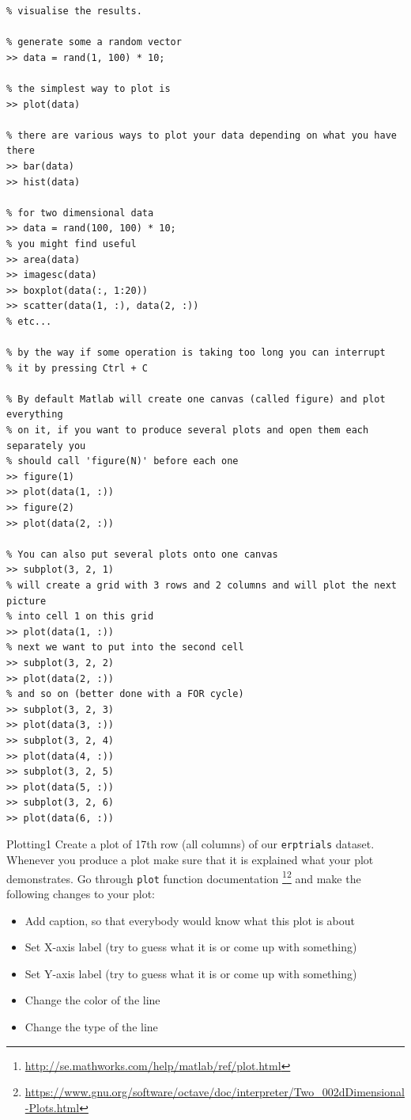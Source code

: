 \documentclass[a4paper,11pt]{article}
\begin{document}
%
%
\begin{lstlisting}[caption={Plotting}]
% One of the most important abilities in any data analysis task is the ability to
% visualise the results.

% generate some a random vector
>> data = rand(1, 100) * 10;

% the simplest way to plot is
>> plot(data)

% there are various ways to plot your data depending on what you have there
>> bar(data)
>> hist(data)

% for two dimensional data
>> data = rand(100, 100) * 10;
% you might find useful
>> area(data)
>> imagesc(data)
>> boxplot(data(:, 1:20))
>> scatter(data(1, :), data(2, :))
% etc...

% by the way if some operation is taking too long you can interrupt
% it by pressing Ctrl + C

% By default Matlab will create one canvas (called figure) and plot everything
% on it, if you want to produce several plots and open them each separately you
% should call 'figure(N)' before each one
>> figure(1)
>> plot(data(1, :))
>> figure(2)
>> plot(data(2, :))

% You can also put several plots onto one canvas
>> subplot(3, 2, 1)
% will create a grid with 3 rows and 2 columns and will plot the next picture
% into cell 1 on this grid
>> plot(data(1, :))
% next we want to put into the second cell
>> subplot(3, 2, 2)
>> plot(data(2, :))
% and so on (better done with a FOR cycle)
>> subplot(3, 2, 3)
>> plot(data(3, :))
>> subplot(3, 2, 4)
>> plot(data(4, :))
>> subplot(3, 2, 5)
>> plot(data(5, :))
>> subplot(3, 2, 6)
>> plot(data(6, :))

\end{lstlisting}


%
%
\begin{exercise}{3}{Plotting}{1}
Create a plot of 17th row (all columns) of our \texttt{erptrials} dataset. Whenever you produce a plot make sure that it is explained what your plot demonstrates. Go through \texttt{plot} function documentation \footnote{\url{http://se.mathworks.com/help/matlab/ref/plot.html}}\footnote{\url{https://www.gnu.org/software/octave/doc/interpreter/Two_002dDimensional-Plots.html}} and make the following changes to your plot:
\begin{itemize}
    \item Add caption, so that everybody would know what this plot is about
    \item Set X-axis label (try to guess what it is or come up with something)
    \item Set Y-axis label (try to guess what it is or come up with something)
    \item Change the color of the line
    \item Change the type of the line
\end{itemize}
\end{exercise}
\end{document}
